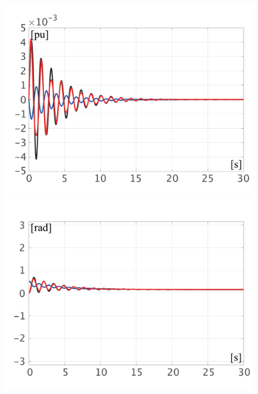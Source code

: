 \documentclass[graybox, envcountchap]{svmult}
\begin{document}
\begin{figure}[t]
  \centering
  {
  \begin{minipage}{0.49\linewidth}
    \centering
    \includegraphics[width = 1.0\linewidth]{figs/Domegalin}
    \medskip
  \end{minipage}
  \begin{minipage}{0.49\linewidth}
    \centering
    \includegraphics[width = 1.0\linewidth]{figs/deltalin}
    \medskip
  \end{minipage}
 \begin{minipage}{0.49\linewidth}
    \centering

\end{minipage}}
\end{figure}
\end{document}
